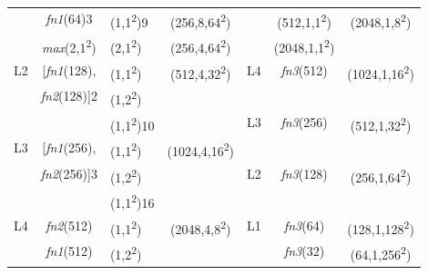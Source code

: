 \documentclass[lettersize,journal]{IEEEtran}
\begin{document}
\begin{table}[!t]
\begin{tabular}{@{}cclcccc@{}}
		& \textit{fn1}(64)3     & (1,1\textsuperscript{2})9                   & (256,8,64\textsuperscript{2})                   &                          & (512,1,1\textsuperscript{2})    & \multirow{2}{*}{(2048,1,8\textsuperscript{2})} \\ \cmidrule(lr){2-4}
		& \textit{max}(2,1\textsuperscript{2})     & (2,1\textsuperscript{2})                     & (256,4,64\textsuperscript{2})                   &                          & (2048,1,1\textsuperscript{2})\textsuperscript{}  &                              \\ \midrule
		\multirow{3}{*}{L2} & {[}\textit{fn1}(128),  & (1,1\textsuperscript{2})                     & \multirow{3}{*}{(512,4,32\textsuperscript{2})}  & \multirow{2}{*}{L4}                       & \textit{fn3}(512)      & \multirow{2}{*}{(1024,1,16\textsuperscript{2})}                 \\
		& \textit{fn2}(128){]}2 & (1,2\textsuperscript{2})                     &                               &                          &               &                              \\ \cmidrule(l){5-7} 
		&               & (1,1\textsuperscript{2})10                  &                               & \multirow{2}{*}{L3}                       & \textit{fn3}(256)      & \multirow{2}{*}{(512,1,32\textsuperscript{2})}                  \\ \cmidrule(r){1-4}
		\multirow{3}{*}{L3} & {[}\textit{fn1}(256),  & (1,1\textsuperscript{2})                     & \multirow{3}{*}{(1024,4,16\textsuperscript{2})} &                          &               &                              \\ \cmidrule(l){5-7} 
		& \textit{fn2}(256){]}3 & (1,2\textsuperscript{2})                     &                               & \multirow{2}{*}{L2}                       & \textit{fn3}(128)      & \multirow{2}{*}{(256,1,64\textsuperscript{2})}                  \\
		&               & (1,1\textsuperscript{2})16                  &                               &                          &               &                              \\ \midrule
		\multirow{3}{*}{L4} & \textit{fn2}(512)      & (1,1\textsuperscript{2})                     & \multirow{3}{*}{(2048,4,8\textsuperscript{2})}  & \multirow{2}{*}{L1}      & \textit{fn3}(64)       & (128,1,128\textsuperscript{2})                 \\ \cmidrule(l){6-7} 
		& \textit{fn1}(512)      & (1,2\textsuperscript{2})                     &                               &                          & \textit{fn3}(32)       & (64,1,256\textsuperscript{2})                  \\ \cmidrule(l){5-7} 

\end{tabular}
\end{table}
\end{document}
